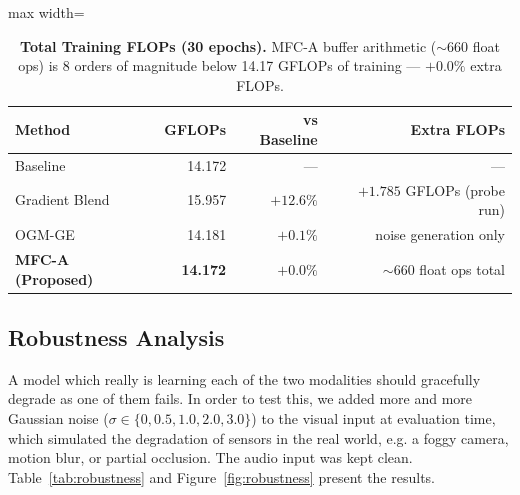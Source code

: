 \documentclass[preprint,a4paper, 10pt, 5p]{elsarticle}
\begin{document}
\begin{table}[h]
\caption{\textbf{Total Training FLOPs (30 epochs).} MFC-A buffer arithmetic ($\sim$660 float ops) is 8 orders of magnitude below 14.17 GFLOPs of training --- $+0.0\%$ extra FLOPs.}
\label{tab:flops}
\centering
\begin{adjustbox}{max width=\linewidth}\begin{tabular}{@{}lrrr@{}}
\toprule
\textbf{Method} & \textbf{GFLOPs} & \textbf{vs Baseline} & \textbf{Extra FLOPs} \\ \midrule
Baseline               & 14.172 & ---       & --- \\
Gradient Blend         & 15.957 & $+12.6\%$ & $+1.785$ GFLOPs (probe run) \\
OGM-GE                 & 14.181 & $+0.1\%$  & noise generation only \\
\textbf{MFC-A (Proposed)} & \textbf{14.172} & $+0.0\%$ & $\sim$660 float ops total \\
\bottomrule
\end{tabular}\end{adjustbox}
\end{table}

\subsection{Robustness Analysis}

A model which really is learning each of the two modalities should gracefully degrade as one of them fails. In order to test this, we added more and more Gaussian noise ($\sigma \in \{0, 0.5, 1.0, 2.0, 3.0\}$) to the visual input at evaluation time, which simulated the degradation of sensors in the real world, e.g. a foggy camera, motion blur, or partial occlusion. The audio input was kept clean. Table~\ref{tab:robustness} and Figure~\ref{fig:robustness} present the results.
\end{document}
